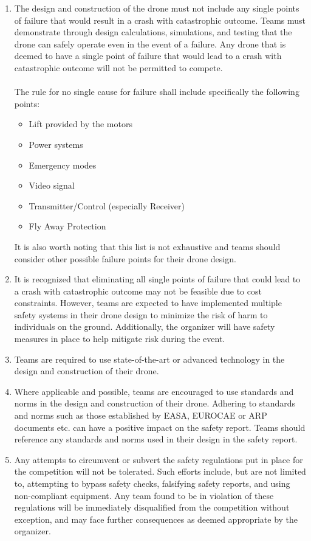 \documentclass{article}
\begin{document}
\begin{enumerate}
  \item The design and construction of the drone must not include any single points of failure that would result in a crash with catastrophic outcome. Teams must demonstrate through design calculations, simulations, and testing that the drone can safely operate even in the event of a failure. Any drone that is deemed to have a single point of failure that would lead to a crash with catastrophic outcome will not be permitted to compete. \\ \\
  The rule for no single cause for failure shall include specifically the following points:
    \begin{itemize}
      \item Lift provided by the motors
      \item Power systems
      \item Emergency modes
      \item Video signal
      \item Transmitter/Control  (especially Receiver)
      \item Fly Away Protection 
    \end{itemize}
  It is also worth noting that this list is not exhaustive and teams should consider other possible failure points for their drone design.
  \item It is recognized that eliminating all single points of failure that could lead to a crash with catastrophic outcome may not be feasible due to cost constraints. However, teams are expected to have implemented multiple safety systems in their drone design to minimize the risk of harm to individuals on the ground. Additionally, the organizer will have safety measures in place to help mitigate risk during the event.
  \item Teams are required to use state-of-the-art or advanced technology in the design and construction of their drone.
  \item Where applicable and possible, teams are encouraged to use standards and norms in the design and construction of their drone. Adhering to standards and norms such as those established by EASA, EUROCAE or ARP documents etc. can have a positive impact on the safety report. Teams should reference any standards and norms used in their design in the safety report.
  \item Any attempts to circumvent or subvert the safety regulations put in place for the competition will not be tolerated. Such efforts include, but are not limited to, attempting to bypass safety checks, falsifying safety reports, and using non-compliant equipment. Any team found to be in violation of these regulations will be immediately disqualified from the competition without exception, and may face further consequences as deemed appropriate by the organizer.

\end{enumerate}
\end{document}

